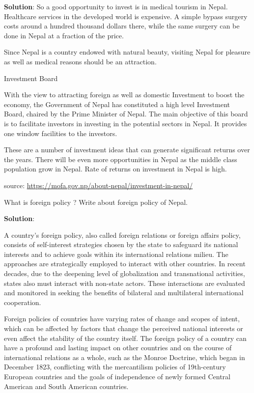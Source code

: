 \documentclass[
  openany]{book}
\newcommand{\question}{\item}
\newenvironment{solution}{ {\bfseries Solution}:}{}
\begin{document}
\begin{questions}
\begin{solution}
So a good opportunity to invest is in medical tourism in Nepal. Healthcare services in the developed world is expensive. A simple bypass surgery costs around a hundred thousand dollars there, while the same surgery can be done in Nepal at a fraction of the price.

Since Nepal is a country endowed with natural beauty, visiting Nepal for pleasure as well as medical reasons should be an attraction.

Investment Board

With the view to attracting foreign as well as domestic Investment to boost the economy, the Government of Nepal has constituted a high level Investment Board, chaired by the Prime Minister of Nepal. The main objective of this board is to facilitate investors in investing in the potential sectors in Nepal. It provides one window facilities to the investors.

These are a number of investment ideas that can generate significant returns over the years. There will be even more opportunities in Nepal as the middle class population grow in Nepal. Rate of returns on investment in Nepal is high.

source: \url{https://mofa.gov.np/about-nepal/investment-in-nepal/}
\end{solution}

\question What is foreign policy ? Write about foreign policy of Nepal.

\begin{solution}

A country's foreign policy, also called foreign relations or foreign affairs policy, consists of self-interest strategies chosen by the state to safeguard its national interests and to achieve goals within its international relations milieu. The approaches are strategically employed to interact with other countries. In recent decades, due to the deepening level of globalization and transnational activities, states also must interact with non-state actors. These interactions are evaluated and monitored in seeking the benefits of bilateral and multilateral international cooperation. 

Foreign policies of countries have varying rates of change and scopes of intent, which can be affected by factors that change the perceived national interests or even affect the stability of the country itself. The foreign policy of a country can have a profound and lasting impact on other countries and on the course of international relations as a whole, such as the Monroe Doctrine, which began in December 1823, conflicting with the mercantilism policies of 19th-century European countries and the goals of independence of newly formed Central American and South American countries.


\end{solution}
\end{questions}
\end{document}
